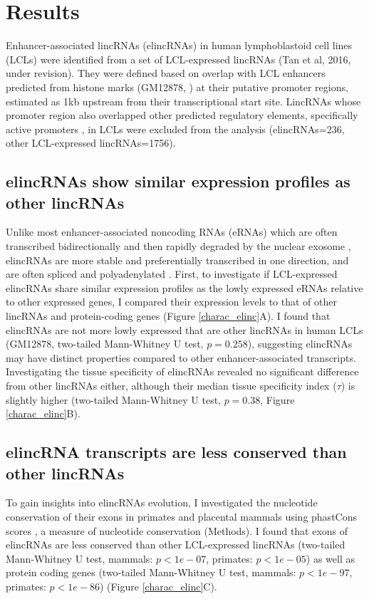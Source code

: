 \documentclass[11pt,a4paper]{report}
\begin{document}
\section*{Results}

Enhancer-associated lincRNAs (elincRNAs) in human lymphoblastoid cell lines (LCLs) were identified from a set of LCL-expressed lincRNAs (Tan et al, 2016, under revision). They were defined based on overlap with LCL enhancers predicted from histone marks (GM12878, \cite{ENCODEProject2012}⁠) at their putative promoter regions, estimated as 1kb upstream from their transcriptional start site. LincRNAs whose promoter region also overlapped other predicted regulatory elements, specifically active promoters \cite{ENCODEProject2012}⁠, in LCLs were excluded from the analysis (elincRNAs=236, other LCL-expressed lincRNAs=1756).

\subsection*{elincRNAs show similar expression profiles as other lincRNAs}

Unlike most enhancer-associated noncoding RNAs (eRNAs) which are often transcribed bidirectionally and then rapidly degraded by the nuclear exosome \cite{Darrow2013} \cite{Lam2014}⁠, elincRNAs are more stable and preferentially transcribed in one direction, and are often spliced and polyadenylated \cite{Marques2013a}⁠. 
First, to investigate if LCL-expressed elincRNAs share similar expression profiles as the lowly expressed eRNAs relative to other expressed genes, I compared  their expression levels to that of other lincRNAs and protein-coding genes (Figure \ref{charac_elinc}A). I found that elincRNAs are not more lowly expressed that are other lincRNAs in human LCLs (GM12878, two-tailed Mann-Whitney U test, $p=0.258$), suggesting elincRNAs may have distinct properties compared to other enhancer-associated transcripts. Investigating the tissue specificity of elincRNAs revealed no significant difference from other lincRNAs either, although their median tissue specificity index ($\tau$) is slightly higher (two-tailed Mann-Whitney U test, $p=0.38$, Figure \ref{charac_elinc}B).

\subsection*{elincRNA transcripts are less conserved than other lincRNAs}

To gain insights into elincRNAs evolution, I investigated the nucleotide conservation of their exons in primates and placental mammals using phastCons scores \cite{Siepel2005}⁠, a measure of nucleotide conservation (Methods). I found that exons of elincRNAs are less conserved than other LCL-expressed lincRNAs (two-tailed Mann-Whitney U test, mammals: $p<1e-07$, primates: $p<1e-05$) as well as  protein coding genes (two-tailed Mann-Whitney U test, mammals: $p<1e-97$, primates: $p<1e-86$) (Figure \ref{charac_elinc}C). 
\end{document}
